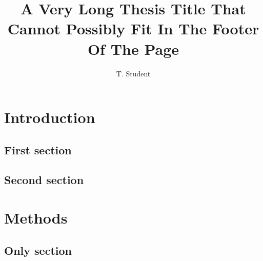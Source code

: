 \documentclass[phd,12pt,a4paper]{bangor}
\title{A Very Long Thesis Title That Cannot Possibly Fit In The Footer Of The Page}
\author{T. Student}
\begin{document}
\maketitle
\chapter{Introduction}
\section{First section}
\section{Second section}
\chapter{Methods}
\section{Only section}
\end{document}
